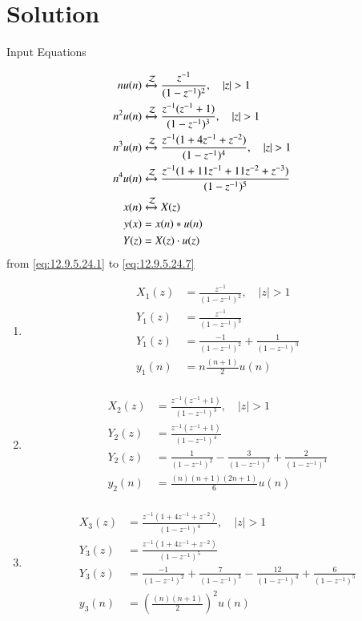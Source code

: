 \documentclass[journal,12pt,onecolumn]{IEEEtran}
\theoremstyle{remark}
\begin{document}
\section*{Solution}
\fi
\begin{table}[h]
  \centering
  
  \caption{Input Equations}
  \label{tab:input-equations}
\end{table}
\begin{align}
    n u(n) & \xleftrightarrow{\mathcal{Z}} \frac{z^{-1}}{(1-z^{-1})^2},  \quad \abs{z} > 1 &\label{eq:12.9.5.24.1} \\
    n^2 u(n) & \xleftrightarrow{\mathcal{Z}} \frac{z^{-1}(z^{-1}+1)}{(1-z^{-1})^3},  \quad \abs{z} > 1 &\label{eq:12.9.5.24.2} \\
    n^3 u(n) & \xleftrightarrow{\mathcal{Z}} \frac{z^{-1}(1+4z^{-1}+z^{-2})}{(1-z^{-1})^4},  \quad \abs{z} >1  &\label{eq:12.9.5.24.3} \\
    n^4 u(n) & \xleftrightarrow{\mathcal{Z}} \frac{z^{-1}(1+11z^{-1}+11z^{-2}+z^{-3})}{(1-z^{-1})^5} &\label{eq:12.9.5.24.4} \\
    x(n) & \xleftrightarrow{\mathcal{Z}} X(z) \label{eq:12.9.5.24.5} \\
    y(x) &= x(n)* u(n) \label{eq:12.9.5.24.6} \\
    Y(z) &= X(z) \cdot u(z)  \label{eq:12.9.5.24.7} 
\end{align}
from \eqref{eq:12.9.5.24.1} to \eqref{eq:12.9.5.24.7}  \\
    \begin{enumerate}
    \item 
    \begin{align}
    X_1(z) &= \frac{z^{-1}}{(1-z^{-1})^2},  \quad |z| > 1 \\
    Y_1(z) &= \frac{z^{-1}}{(1-z^{-1})^3} \\
    Y_1(z) &= \frac{-1}{(1-z^{-1})^2}+\frac{1}{(1-z^{-1})^3} \\
    y_1(n) &= n\frac{(n+1)}{2}u(n)\\
    \end{align}
    \item
    \begin{align} 
    X_2(z) &= \frac{z^{-1}(z^{-1}+1)}{(1-z^{-1})^3},  \quad |z| > 1 \\
    Y_2(z) &= \frac{z^{-1}(z^{-1}+1)}{(1-z^{-1})^4} \\ 
    Y_2(z) &= \frac{1}{(1-z^{-1})^2}-\frac{3}{(1-z^{-1})^3}+\frac{2}{(1-z^{-1})^4} \\
    y_2(n) &= \frac{(n)(n+1)(2n+1)}{6}u(n) \\
    \end{align}
    \item 
    \begin{align}
    X_3(z) &= \frac{z^{-1}(1+4z^{-1}+z^{-2})}{(1-z^{-1})^4},  \quad |z| > 1 \\
    Y_3(z) &= \frac{z^{-1}(1+4z^{-1}+z^{-2})}{(1-z^{-1})^5}\\
    Y_3(z) &= \frac{-1}{(1-z^{-1})^2}+\frac{7}{(1-z^{-1})^3}-\frac{12}{(1-z^{-1})^4}+\frac{6}{(1-z^{-1})^5}\\
    y_3(n) &= \left(\frac{(n)(n+1)}{2}\right)^2u(n)
    \end{align}
    \end{enumerate}
\end{document}
